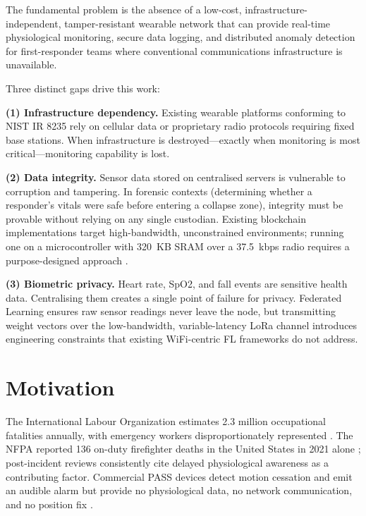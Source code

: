The fundamental problem is the absence of a low-cost, infrastructure-independent, tamper-resistant wearable network that can provide real-time physiological monitoring, secure data logging, and distributed anomaly detection for first-responder teams where conventional communications infrastructure is unavailable.

Three distinct gaps drive this work:

\textbf{(1) Infrastructure dependency.} Existing wearable platforms conforming to NIST IR 8235 \cite{NIST_IR_8235} rely on cellular data or proprietary radio protocols requiring fixed base stations. When infrastructure is destroyed—exactly when monitoring is most critical—monitoring capability is lost.

\textbf{(2) Data integrity.} Sensor data stored on centralised servers is vulnerable to corruption and tampering. In forensic contexts (determining whether a responder's vitals were safe before entering a collapse zone), integrity must be provable without relying on any single custodian. Existing blockchain implementations target high-bandwidth, unconstrained environments; running one on a microcontroller with 320~KB SRAM over a 37.5~kbps radio requires a purpose-designed approach \cite{Semtech_SX1276_datasheet}.

\textbf{(3) Biometric privacy.} Heart rate, SpO2, and fall events are sensitive health data. Centralising them creates a single point of failure for privacy. Federated Learning ensures raw sensor readings never leave the node, but transmitting weight vectors over the low-bandwidth, variable-latency LoRa channel introduces engineering constraints that existing WiFi-centric FL frameworks do not address.

\section{Motivation}

The International Labour Organization estimates 2.3 million occupational fatalities annually, with emergency workers disproportionately represented \cite{ILO_safety_stats}. The NFPA reported 136 on-duty firefighter deaths in the United States in 2021 alone \cite{NFPA_2021_firefighter}; post-incident reviews consistently cite delayed physiological awareness as a contributing factor. Commercial PASS devices detect motion cessation and emit an audible alarm but provide no physiological data, no network communication, and no position fix \cite{IEEE_PST_wearables}.


